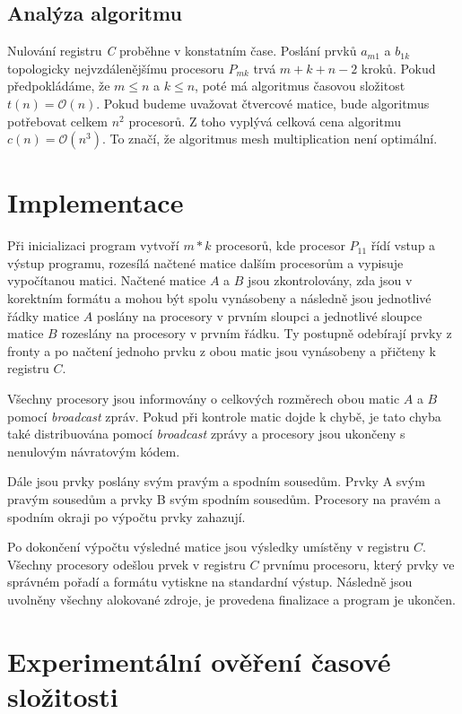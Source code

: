\documentclass[11pt,a4paper]{article}
\begin{document}
\subsection{Analýza algoritmu}
Nulování registru \textit{C} proběhne v konstatním čase. Poslání prvků $a_{m1}$ a $b_{1k}$ topologicky nejvzdálenějšímu procesoru $P_{mk}$ trvá $m+k+n - 2$ kroků. Pokud předpokládáme, že $m \leq n$ a $k \leq n$, poté má algoritmus časovou složitost $t(n) = \mathcal{O}(n)$. Pokud budeme uvažovat čtvercové matice, bude algoritmus potřebovat celkem $n^2$ procesorů. Z toho vyplývá celková cena algoritmu $c(n) = \mathcal{O}(n^3)$. To značí, že algoritmus mesh multiplication není optimální.

\section{Implementace}

Při inicializaci program vytvoří $m*k$ procesorů, kde procesor $P_{11}$ řídí vstup a výstup programu, rozesílá načtené matice dalším procesorům a vypisuje vypočítanou matici. Načtené matice $A$ a $B$ jsou zkontrolovány, zda jsou v korektním formátu a mohou být spolu vynásobeny a následně jsou jednotlivé řádky matice $A$ poslány na procesory v prvním sloupci a jednotlivé sloupce matice $B$ rozeslány na procesory v prvním řádku. Ty postupně odebírají prvky z fronty a po načtení jednoho prvku z obou matic jsou vynásobeny a přičteny k registru $C$.

Všechny procesory jsou informovány o celkových rozměrech obou matic $A$ a $B$ pomocí \textit{broadcast} zpráv. Pokud při kontrole matic dojde k chybě, je tato chyba také distribuována pomocí \textit{broadcast} zprávy a procesory jsou ukončeny s nenulovým návratovým kódem.

Dále jsou prvky poslány svým pravým a spodním sousedům. Prvky A svým pravým sousedům a prvky B svým spodním sousedům. Procesory na pravém a spodním okraji po výpočtu prvky zahazují.

Po dokončení výpočtu výsledné matice jsou výsledky umístěny v registru $C$. Všechny procesory odešlou prvek v registru $C$ prvnímu procesoru, který prvky ve správném pořadí a formátu vytiskne na standardní výstup. Následně jsou uvolněny všechny alokované zdroje, je provedena finalizace a program je ukončen.

\section{Experimentální ověření časové složitosti}
\end{document}
